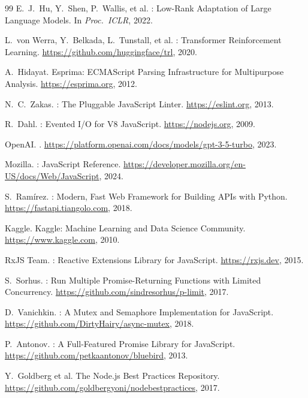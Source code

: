 \documentclass[runningheads]{llncs}
\begin{document}
\begin{thebibliography}{99}
  E.\ J.\ Hu, Y.\ Shen, P.\ Wallis, et al.
  : Low-Rank Adaptation of Large Language Models.
  \newblock In \emph{Proc.\ ICLR}, 2022.

  L.\ von Werra, Y.\ Belkada, L.\ Tunstall, et al.
  : Transformer Reinforcement Learning.
  \newblock \url{https://github.com/huggingface/trl}, 2020.

  A.\ Hidayat.
  \newblock Esprima: ECMAScript Parsing Infrastructure for Multipurpose Analysis.
  \newblock \url{https://esprima.org}, 2012.

  N.\ C.\ Zakas.
  : The Pluggable JavaScript Linter.
  \newblock \url{https://eslint.org}, 2013.

  R.\ Dahl.
  : Evented I/O for V8 JavaScript.
  \newblock \url{https://nodejs.org}, 2009.

  OpenAI.
  .
  \newblock \url{https://platform.openai.com/docs/models/gpt-3-5-turbo}, 2023.

  Mozilla.
  : JavaScript Reference.
  \newblock \url{https://developer.mozilla.org/en-US/docs/Web/JavaScript}, 2024.

  S.\ Ramírez.
  : Modern, Fast Web Framework for Building APIs with Python.
  \newblock \url{https://fastapi.tiangolo.com}, 2018.

  Kaggle.
  \newblock Kaggle: Machine Learning and Data Science Community.
  \newblock \url{https://www.kaggle.com}, 2010.

  RxJS Team.
  : Reactive Extensions Library for JavaScript.
  \newblock \url{https://rxjs.dev}, 2015.

  S.\ Sorhus.
  : Run Multiple Promise-Returning Functions with Limited Concurrency.
  \newblock \url{https://github.com/sindresorhus/p-limit}, 2017.

  D.\ Vanichkin.
  : A Mutex and Semaphore Implementation for JavaScript.
  \newblock \url{https://github.com/DirtyHairy/async-mutex}, 2018.

  P.\ Antonov.
  : A Full-Featured Promise Library for JavaScript.
  \newblock \url{https://github.com/petkaantonov/bluebird}, 2013.

  Y.\ Goldberg et al.
  \newblock The {Node.js} Best Practices Repository.
  \newblock \url{https://github.com/goldbergyoni/nodebestpractices}, 2017.


\end{thebibliography}
\end{document}
